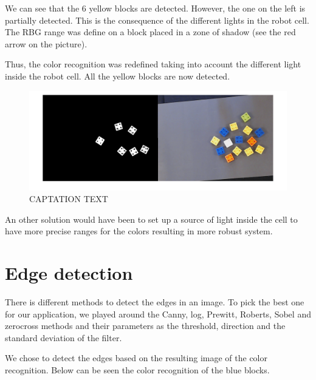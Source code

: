 \begin{flushleft}
We can see that the 6 yellow blocks are detected. However, the one on the left is partially detected. This is the consequence of the different lights in the robot cell. The RBG range was define on a block placed in a zone of shadow (see the red arrow on the picture).
\end{flushleft}  
\par

\begin{flushleft}
Thus, the color recognition was redefined taking into account the different light inside the robot cell. All the yellow blocks are now detected.
\end{flushleft}


\begin{figure}[hb]
  \centering
  \includegraphics[scale=0.3]{figures/Thres_Y_good.png}
  \caption[LABEL] {CAPTATION TEXT}
\end{figure}

\begin{flushleft}
An other solution would have been to set up a source of light inside the cell to have more precise ranges for the colors resulting in more robust system.
\end{flushleft}



 \section{Edge detection}

	There is different methods to detect the edges in an image. To pick the best one for our application, we played around the Canny, log, Prewitt, Roberts, Sobel and zerocross methods and their parameters as the threshold, direction and the standard deviation of the filter. \par

 \begin{flushleft}
	We chose to detect the edges based on the resulting image of the color recognition. Below can be seen the color recognition of the blue blocks.
 \end{flushleft}

